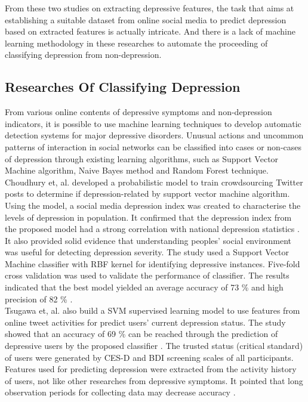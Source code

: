\documentclass[12pt]{article}
\begin{document}
From these two studies on extracting depressive features, the task that aims at establishing a suitable dataset from online social media to predict depression based on extracted features is actually intricate. And there is a lack of machine learning methodology in these researches to automate the proceeding of classifying depression from non-depression.\\
\medskip
\subsection{Researches Of Classifying Depression}
From various online contents of depressive symptoms and non-depression indicators, it is possible to use machine learning techniques to develop automatic detection systems for major depressive disorders. Unusual actions and uncommon patterns of interaction \cite{Wongkoblap} in social networks can be classified into cases or non-cases of depression through existing learning algorithms,  such as Support Vector Machine algorithm, Naive Bayes method and Random Forest technique.
\\

Choudhury et, al. \cite{De Choudhury} developed a probabilistic model to train crowdsourcing Twitter posts to determine if depression-related by support vector machine algorithm. Using the model, a social media depression index was created to characterise the levels of depression in population. It confirmed that the depression index from the proposed model had a strong correlation with national depression statistics \cite{De Choudhury}. It also provided solid evidence that understanding peoples' social environment was useful for detecting depression severity. The study used a Support Vector Machine classifier with RBF kernel for identifying depressive instances. Five-fold cross validation was used to validate the performance of classifier. The results indicated that the best model yielded an average accuracy of 73 \% and high precision of 82 \% \cite{De Choudhury}.
\\   

Tsugawa et, al. \cite{Tsugawa} also build a SVM supervised learning model to use features from online tweet activities for predict users' current depression status. The study showed that an accuracy of 69 \% can be reached through the prediction of depressive users by the proposed classifier \cite{Tsugawa}. The trusted status (critical standard) of users were generated by CES-D and BDI screening scales of all participants. Features used for predicting depression were extracted from the activity history of users, not like other researches from depressive symptoms. It pointed that long observation periods for collecting data may decrease accuracy \cite{Tsugawa}.  
\\
\end{document}
